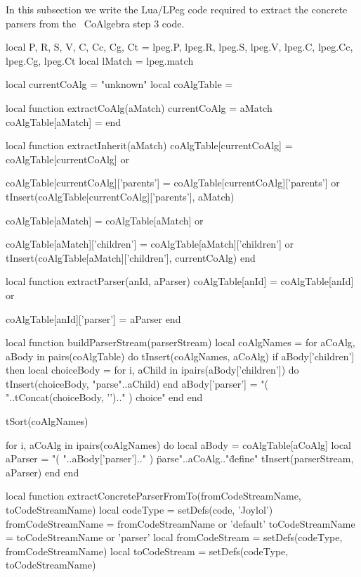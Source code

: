 In this subsection we write the Lua/LPeg code required to extract the 
concrete parsers from the \joylol\ CoAlgebra step 3 code.

\startMkIVCode
\def\extractConcreteParserFromTo#1#2{%
  \directlua{%
    thirddata.literateProgs.extractConcreteParserFromTo('#1', '#2')
  }
}
\stopMkIVCode

\startLuaCode
local P, R, S, V, C, Cc, Cg, Ct = 
  lpeg.P, lpeg.R, lpeg.S, lpeg.V, lpeg.C, lpeg.Cc, lpeg.Cg, lpeg.Ct
local lMatch = lpeg.match

local currentCoAlg = "unknown"
local coAlgTable   = {}

local function extractCoAlg(aMatch)
  currentCoAlg       = aMatch
  coAlgTable[aMatch] = {}
end

local function extractInherit(aMatch)
  coAlgTable[currentCoAlg] = coAlgTable[currentCoAlg] or {}
  
  coAlgTable[currentCoAlg]['parents'] = 
    coAlgTable[currentCoAlg]['parents'] or {}
  tInsert(coAlgTable[currentCoAlg]['parents'], aMatch)  
  
  coAlgTable[aMatch] = coAlgTable[aMatch] or { }
  
  coAlgTable[aMatch]['children'] = 
    coAlgTable[aMatch]['children'] or {}
  tInsert(coAlgTable[aMatch]['children'], currentCoAlg)
end

local function extractParser(anId, aParser)
  coAlgTable[anId] = coAlgTable[anId] or {}
  
  coAlgTable[anId]['parser'] = aParser
end

local function buildParserStream(parserStream)
  local coAlgNames = { }
  for aCoAlg, aBody in pairs(coAlgTable) do
    tInsert(coAlgNames, aCoAlg)
    if aBody['children'] then
      local choiceBody = {}
      for i, aChild in ipairs(aBody['children']) do
        tInsert(choiceBody, "parse"..aChild)
      end
      aBody['parser'] = "( "..tConcat(choiceBody, '\n').." ) choice"
    end
  end
  
  tSort(coAlgNames)
  
  for i, aCoAlg in ipairs(coAlgNames) do
    local aBody   = coAlgTable[aCoAlg]
    local aParser = "( "..aBody['parser'].." ) \"parse"..aCoAlg.."\" define"
    tInsert(parserStream, aParser)
  end
end

local function extractConcreteParserFromTo(fromCodeStreamName, toCodeStreamName)
  local codeType       = setDefs(code, 'Joylol')
  fromCodeStreamName   = fromCodeStreamName or 'default'
  toCodeStreamName     = toCodeStreamName   or 'parser'
  local fromCodeStream = setDefs(codeType, fromCodeStreamName)
  local toCodeStream   = setDefs(codeType, toCodeStreamName)

